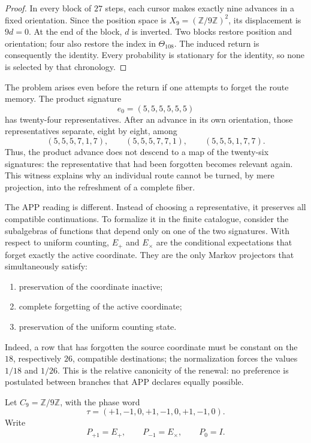 \begin{proof}
In every block of \(27\) steps, each cursor makes exactly nine advances in a fixed orientation. Since the position space is \(X_9=(\mathbb Z/9\mathbb Z)^2\), its displacement is \(9d=0\). At the end of the block, \(d\) is inverted. Two blocks restore position and orientation; four also restore the index in \(\Theta_{108}\). The induced return is consequently the identity. Every probability is stationary for the identity, so none is selected by that chronology.
\end{proof}

The problem arises even before the return if one attempts to forget the
route memory. The product signature
\[
 e_0=(5,5,5,5,5,5)
\]
has twenty-four representatives. After an advance in its own orientation,
those representatives separate, eight by eight, among
\[
 (5,5,5,7,1,7),\qquad
 (5,5,5,7,7,1),\qquad
 (5,5,5,1,7,7).
\]
Thus, the product advance does not descend to a map of the twenty-six
signatures: the representative that had been forgotten becomes relevant again. This
witness explains why an individual route cannot be turned, by mere
projection, into the refreshment of a complete fiber.

The APP reading is different. Instead of choosing a representative, it preserves all
compatible continuations. To formalize it in the finite catalogue,
consider the subalgebras of functions that depend only on one of the two
signatures. With respect to uniform counting, \(E_+\) and \(E_\times\) are the
conditional expectations that forget exactly the active coordinate. They are the
only Markov projectors that simultaneously satisfy:
\begin{enumerate}
  \item preservation of the coordinate inactive;
  \item complete forgetting of the active coordinate;
  \item preservation of the uniform counting state.
\end{enumerate}
Indeed, a row that has forgotten the source coordinate must be
constant on the \(18\), respectively \(26\), compatible destinations; the
normalization forces the values \(1/18\) and \(1/26\). This is the relative
canonicity of the renewal: no preference is postulated between branches that APP
declares equally possible.

Let \(C_9=\mathbb Z/9\mathbb Z\), with the phase word
\[
 \tau=(+1,-1,0,+1,-1,0,+1,-1,0).
\]
Write
\[
 P_{+1}=E_+,
 \qquad P_{-1}=E_\times,
 \qquad P_0=I.
\]

